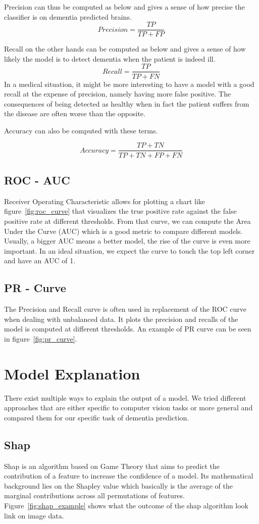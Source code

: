 Precision can thus be computed as below and gives a sense of how precise the classifier is on dementia predicted brains.
$$Precision = \frac{TP}{TP +  FP}$$

Recall on the other hands can be computed as below and gives a sense of how likely the model is to detect dementia when the patient is indeed ill.
$$Recall =\frac{TP}{TP + FN}$$
In a medical situation, it might be more interesting to have a model with a good recall at the expense of precision, namely having more false positive. The consequences of being detected as healthy when in fact the patient suffers from the disease are often worse than the opposite.

Accuracy can also be computed with these terms.


$$Accuracy = \frac{TP + TN}{TP + TN + FP + FN}$$


\subsection{ROC - AUC}
Receiver Operating Characteristic allows for plotting a chart like figure~\ref{fig:roc_curve} that visualizes the true positive rate against the false positive rate at different thresholds. From that curve, we can compute the Area Under the Curve (AUC) which is a good metric to compare different models. Usually, a bigger AUC means a better model, the rise of the curve is even more important.
In an ideal situation, we expect the curve to touch the top left corner and have an AUC of 1.

\subsection{PR - Curve}
The Precision and Recall curve is often used in replacement of the ROC curve when dealing with unbalanced data. It plots the precision and recalls of the model is computed at different thresholds. An example of PR curve can be seen in figure~\ref{fig:pr_curve}.

\section{Model Explanation}
\label{sec:model_explaination}
There exist multiple ways to explain the output of a model. We tried different approaches that are either specific to computer vision tasks or more general and compared them for our specific task of dementia prediction.

\subsection{Shap}
Shap is an algorithm based on Game Theory that aims to predict the contribution of a feature to increase the confidence of a model. Its mathematical background lies on the Shapley value which basically is the average of the marginal contributions across all permutations of features. Figure~\ref{fig:shap_example} shows what the outcome of the shap algorithm look link on image data.

